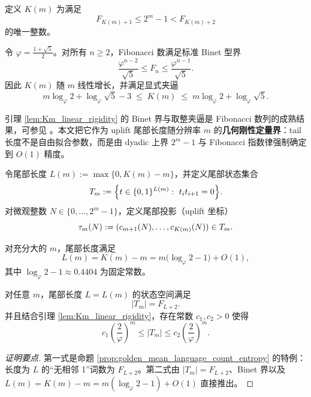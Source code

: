 \begin{definition}[截断覆盖指数]\label{def:K_of_m}
定义 \(K(m)\) 为满足
$$
F_{K(m)+1}\le 2^m-1 < F_{K(m)+2}
$$
的唯一整数。
\end{definition}

\begin{lemma}\label{lem:Km_linear_rigidity}
令 \(\varphi=\frac{1+\sqrt5}{2}\)。对所有 \(n\ge 2\)，Fibonacci 数满足标准 Binet 型界
$$
\frac{\varphi^{n-2}}{\sqrt5}\le F_n \le \frac{\varphi^{n-1}}{\sqrt5}.
$$
因此 \(K(m)\) 随 \(m\) 线性增长，并满足显式夹逼
$$
m\log_{\varphi}2+\log_{\varphi}\sqrt5-3
\;\le\;
K(m)
\;\le\;
m\log_{\varphi}2+\log_{\varphi}\sqrt5.
$$
\end{lemma}

\begin{remark}[引用]
引理 \ref{lem:Km_linear_rigidity} 的 Binet 界与取整夹逼是 Fibonacci 数列的成熟结果，可参见 \cite{Koshy2001}。本文把它作为 uplift 尾部长度随分辨率 \(m\) 的\textbf{几何刚性定量界}：tail 长度不是自由拟合参数，而是由 dyadic 上界 \(2^m-1\) 与 Fibonacci 指数律强制确定到 \(O(1)\) 精度。
\end{remark}

\begin{definition}[尾部时间纤维]\label{def:time_fiber}
令尾部长度 \(L(m):=\max\{0,K(m)-m\}\)，并定义尾部状态集合
$$
T_m:=\Bigl\{t\in\{0,1\}^{L(m)}:\ t_it_{i+1}=0\Bigr\}.
$$
对微观整数 \(N\in\{0,\dots,2^m-1\}\)，定义尾部投影（uplift 坐标）
$$
\tau_m(N):=(c_{m+1}(N),\dots,c_{K(m)}(N))\in T_m.
$$
\end{definition}

\begin{corollary}[尾部长度的线性率]\label{cor:tail_length_linear_rate}
对充分大的 \(m\)，尾部长度满足
$$
L(m)=K(m)-m = m\bigl(\log_{\varphi}2-1\bigr)+O(1),
$$
其中 \(\log_{\varphi}2-1\approx 0.4404\) 为固定常数。
\end{corollary}

\begin{proposition}[尾部状态空间的精确计数与指数率]\label{prop:tail_state_count_rate}
对任意 \(m\)，尾部长度 \(L=L(m)\) 的状态空间满足
$$
|T_m| = F_{L+2}.
$$
并且结合引理 \ref{lem:Km_linear_rigidity}，存在常数 \(c_1,c_2>0\) 使得
$$
c_1\left(\frac{2}{\varphi}\right)^m \le |T_m| \le c_2\left(\frac{2}{\varphi}\right)^m.
$$
\end{proposition}

\begin{proof}[证明要点]
第一式是命题 \ref{prop:golden_mean_language_count_entropy} 的特例：长度为 \(L\) 的“无相邻 1”词数为 \(F_{L+2}\)。第二式由 \(|T_m|=F_{L+2}\)、Binet 界以及 \(L(m)=K(m)-m= m(\log_{\varphi}2-1)+O(1)\) 直接推出。
\end{proof}

